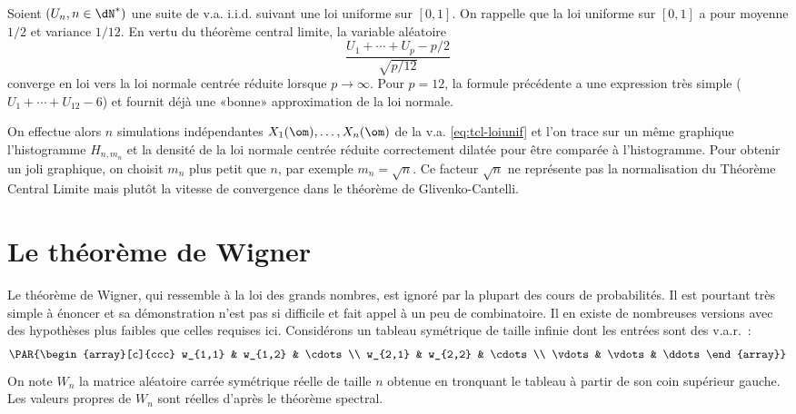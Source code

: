 Soient $(U_n,n\in\dN^*)$ une suite de v.a. i.i.d. suivant une loi uniforme sur
$[0,1]$.  On rappelle que la loi uniforme sur $[0,1]$ a pour moyenne $1/2$ et
variance $1/12$. En vertu du théorème central limite, la variable aléatoire
\begin{equation}\label{eq:tcl-loiunif}
\frac{U_1+\cdots+U_{p}-p/2}{\sqrt{p/12}}
\end{equation}
converge en loi vers la loi normale centrée réduite lorsque $p\to\infty$. Pour
$p=12$, la formule précédente a une expression très simple ($U_1+\cdots+U_{12}-6$)
et fournit déjà une «bonne» approximation de la loi normale. 

On effectue alors $n$ simulations indépendantes $X_1(\om),\ldots,X_n(\om)$ de la
v.a. \eqref{eq:tcl-loiunif} et l'on trace sur un même graphique l'histogramme
$H_{n,m_n}$ et la densité de la loi normale centrée réduite correctement
dilatée pour être comparée à l'histogramme. Pour obtenir un joli graphique, on
choisit $m_n$ plus petit que $n$, par exemple $m_n=\sqrt{n}$. Ce facteur
$\sqrt{n}$ ne représente pas la normalisation du Théorème Central Limite mais
plutôt la vitesse de convergence dans le théorème de Glivenko-Cantelli. 

%
%
%

%
\section{Le théorème de Wigner}
%

Le théorème de Wigner, qui ressemble à la loi des grands nombres, est ignoré
par la plupart des cours de probabilités. Il est pourtant très simple à
énoncer et sa démonstration n'est pas si difficile et fait appel à un peu de
combinatoire. Il en existe de nombreuses versions avec des hypothèses plus
faibles que celles requises ici.
Considérons un tableau symétrique de taille infinie dont les entrées sont des
v.a.r.~:
$$
\PAR{\begin{array}[c]{ccc}
 w_{1,1} & w_{1,2} & \cdots \\
 w_{2,1} & w_{2,2} & \cdots \\
 \vdots     & \vdots    & \ddots 
\end{array}}
$$
On note $W_n$ la matrice aléatoire carrée symétrique réelle de taille $n$
obtenue en tronquant le tableau à partir de son coin supérieur gauche. 
Les valeurs propres de $W_n$ sont réelles
d'après le théorème spectral.

